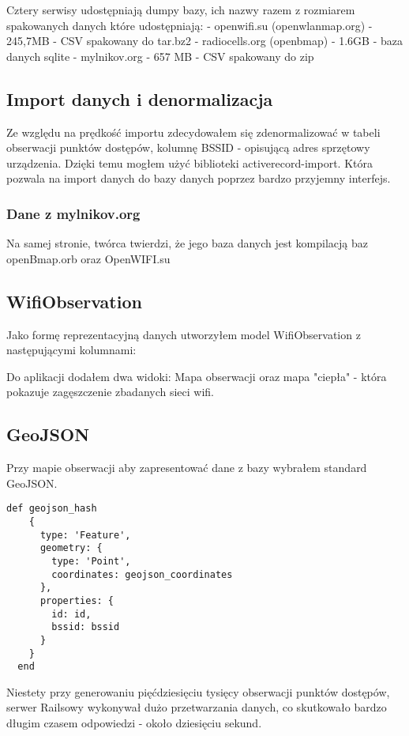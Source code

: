 Cztery serwisy udostępniają dumpy bazy, ich nazwy razem z rozmiarem spakowanych danych które udostępniają:
 - openwifi.su (openwlanmap.org) - 245,7MB - CSV spakowany do tar.bz2
 - radiocells.org (openbmap) - 1.6GB - baza danych sqlite
 - mylnikov.org - 657 MB - CSV spakowany do zip

\subsection{Import danych i denormalizacja}
Ze względu na prędkość importu zdecydowałem się zdenormalizować w tabeli obserwacji punktów dostępów, kolumnę BSSID - opisującą adres sprzętowy urządzenia. Dzięki temu mogłem użyć biblioteki activerecord-import. Która pozwala na import danych do bazy danych poprzez bardzo przyjemny interfejs.

\subsubsection{Dane z mylnikov.org}

Na samej stronie, twórca twierdzi, że jego baza danych jest kompilacją baz openBmap.orb oraz OpenWIFI.su

\subsection{WifiObservation}
Jako formę reprezentacyjną danych utworzyłem model WifiObservation z następującymi kolumnami:

Do aplikacji dodałem dwa widoki: Mapa obserwacji oraz mapa "ciepła" - która pokazuje zagęszczenie zbadanych sieci wifi.

\subsection{GeoJSON}
Przy mapie obserwacji aby zapresentować dane z bazy wybrałem standard GeoJSON. 

\begin{lstlisting}[caption=Ruby geojson\_hash]
  def geojson_hash
    {
      type: 'Feature',
      geometry: {
        type: 'Point',
        coordinates: geojson_coordinates
      },
      properties: {
        id: id,
        bssid: bssid
      }
    }
  end
\end{lstlisting}

Niestety przy generowaniu pięćdziesięciu tysięcy obserwacji punktów dostępów, serwer Railsowy wykonywał dużo przetwarzania danych, co skutkowało bardzo długim czasem odpowiedzi - około dziesięciu sekund.

